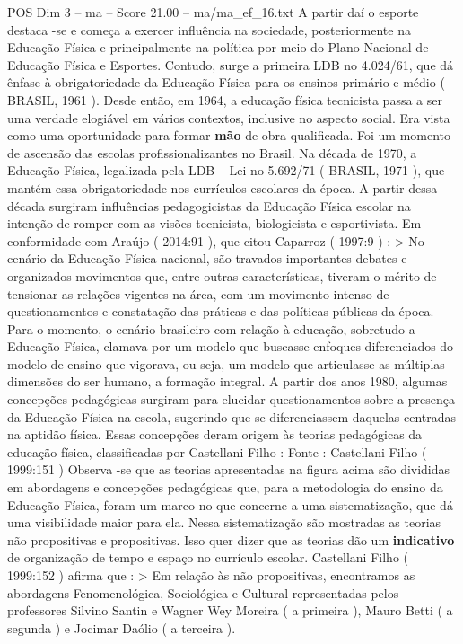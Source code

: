 \begin{textsample}{POS Dim 3 – ma – Score 21.00 – ma/ma\_ef\_16.txt}
A partir daí o esporte destaca -se e começa a exercer influência na sociedade, posteriormente na Educação Física e principalmente na política por meio do Plano Nacional de Educação Física e Esportes.
Contudo, surge a primeira LDB no 4.024/61, que dá ênfase à obrigatoriedade da Educação Física para os ensinos primário e médio ( BRASIL, 1961 ).
Desde então, em 1964, a educação física tecnicista passa a ser uma verdade elogiável em vários contextos, inclusive no aspecto social.
Era vista como uma oportunidade para formar \textbf{mão} de obra qualificada.
Foi um momento de ascensão das escolas profissionalizantes no Brasil.
Na década de 1970, a Educação Física, legalizada pela LDB – Lei no 5.692/71 ( BRASIL, 1971 ), que mantém essa obrigatoriedade nos currículos escolares da época.
A partir dessa década surgiram influências pedagogicistas da Educação Física escolar na intenção de romper com as visões tecnicista, biologicista e esportivista.
Em conformidade com Araújo ( 2014:91 ), que citou Caparroz ( 1997:9 ) : > No cenário da Educação Física nacional, são travados importantes debates e organizados movimentos que, entre outras características, tiveram o mérito de tensionar as relações vigentes na área, com um movimento intenso de questionamentos e constatação das práticas e das políticas públicas da época.
Para o momento, o cenário brasileiro com relação à educação, sobretudo a Educação Física, clamava por um modelo que buscasse enfoques diferenciados do modelo de ensino que vigorava, ou seja, um modelo que articulasse as múltiplas dimensões do ser humano, a formação integral.
A partir dos anos 1980, algumas concepções pedagógicas surgiram para elucidar questionamentos sobre a presença da Educação Física na escola, sugerindo que se diferenciassem daquelas centradas na aptidão física.
Essas concepções deram origem às teorias pedagógicas da educação física, classificadas por Castellani Filho : Fonte : Castellani Filho ( 1999:151 ) Observa -se que as teorias apresentadas na figura acima são divididas em abordagens e concepções pedagógicas que, para a metodologia do ensino da Educação Física, foram um marco no que concerne a uma sistematização, que dá uma visibilidade maior para ela.
Nessa sistematização são mostradas as teorias não propositivas e propositivas.
Isso quer dizer que as teorias dão um \textbf{indicativo} de organização de tempo e espaço no currículo escolar.
Castellani Filho ( 1999:152 ) afirma que : > Em relação às não propositivas, encontramos as abordagens Fenomenológica, Sociológica e Cultural representadas pelos professores Silvino Santin e Wagner Wey Moreira ( a primeira ), Mauro Betti ( a segunda ) e Jocimar Daólio ( a terceira ).

\end{textsample}
